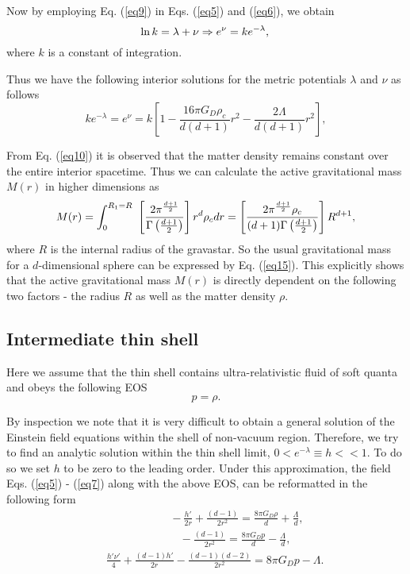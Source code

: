 \documentclass[preprint,12pt]{elsarticle}
\begin{document}
Now by employing Eq. (\ref{eq9}) in Eqs. (\ref{eq5}) and (\ref{eq6}), we obtain
\begin{equation}
  \ln k =\lambda + \nu \Rightarrow e^{\nu}=ke^{-\lambda}, \\ \label{eq13}
\end{equation}
where $k$ is a constant of integration.

Thus we have the following interior solutions for the metric
potentials $\lambda$ and $\nu$ as follows
\begin{equation}
 ke^{-\lambda} =e^\nu =k\left[1-\frac{16\pi G_D\rho_c}{d(d+1)}r^2- \frac{2\Lambda }{d(d+1)}r^2\right],\label{eq14}
\end{equation}

From Eq. (\ref{eq10}) it is observed that the matter density remains constant over the entire interior spacetime.
Thus we can calculate the active gravitational mass $M(r)$ in higher dimensions as
\begin{equation}
M(r) = \int_0^{{R_1=R}}~ \left[  \frac{2 \pi^{\frac{d+1}{2}}
}{\Gamma \left(\frac{d+1}{2}\right)}\right]r^d \rho_c dr
\\ = \left[ \frac{2 \pi^{\frac{d+1}{2}} \rho_c}{(d+1)\Gamma
\left(\frac{d+1}{2}\right)}\right]
R^{d+1},\label{eq15}
\end{equation}
where $R$ is the internal radius of the gravastar. So the usual gravitational mass for a $d$-dimensional sphere
can be expressed by Eq. (\ref{eq15}). This explicitly shows that the active gravitational mass $M(r)$ is directly
dependent on the following two factors - the radius $R$ as well as the matter density $\rho$.


\subsection{Intermediate thin shell}
Here we assume that the thin shell contains ultra-relativistic fluid of soft quanta and obeys the following EOS
\begin{equation}
p =\rho. \label{eq17}
\end{equation}

By inspection we note that it is very difficult to obtain a general solution of the Einstein field equations within the shell of non-vacuum region. Therefore, we try to find an analytic solution within the thin shell limit,  $0<e^{-\lambda}\equiv h <<1$.  To do so we set $h$ to be zero to the leading order. Under this approximation, the field Eqs. (\ref{eq5}) - (\ref{eq7}) along with the above EOS, can be reformatted in the following form
\begin{eqnarray}
&&~~~~~~~~~~~~~~~~~~~~~~~~~~-\frac{h'}{2 r}  + \frac{(d-1)}{2r^2}=\frac{8\pi G_D\rho}{d}+\frac{\Lambda}{d},  \label{eq18} \\
&&~~~~~~~~~~~~~~~~~~~~~~~~~~~~~~ -\frac{(d-1)}{2r^2}= \frac{8\pi G_Dp}{d}-\frac{\Lambda}{d}, \label{eq19} \\
&&\frac{h'\nu'}{4}+\frac{(d-1)h'}{2r} -\frac{(d-1)(d-2)}{2r^2}=8\pi G_D p-\Lambda. \label{eq20}
\end{eqnarray}
\end{document}
